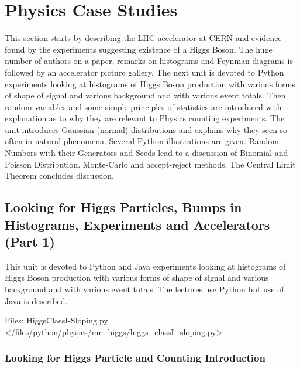 

\section{Physics Case Studies}\label{physics-case-study}

\FILENAME

This section starts by describing the LHC accelerator at CERN and
evidence found by the experiments suggesting existence of a Higgs Boson.
The huge number of authors on a paper, remarks on histograms and Feynman
diagrams is followed by an accelerator picture gallery. The next unit is
devoted to Python experiments looking at histograms of Higgs Boson
production with various forms of shape of signal and various background
and with various event totals. Then random variables and some simple
principles of statistics are introduced with explanation as to why they
are relevant to Physics counting experiments. The unit introduces
Gaussian (normal) distributions and explains why they seen so often in
natural phenomena. Several Python illustrations are given. Random
Numbers with their Generators and Seeds lead to a discussion of Binomial
and Poisson Distribution. Monte-Carlo and accept-reject methods. The
Central Limit Theorem concludes discussion.

\subsection{Looking for Higgs Particles, Bumps in Histograms,
Experiments and Accelerators (Part
1)}\label{looking-for-higgs-particles-bumps-in-histograms-experiments-and-accelerators-part-1}

This unit is devoted to Python and Java experiments looking at
histograms of Higgs Boson production with various forms of shape of
signal and various background and with various event totals. The
lectures use Python but use of Java is described.


Files:
HiggsClassI-Sloping.py \textless{}/files/python/physics/mr\_higgs/higgs\_classI\_sloping.py\textgreater{}\_

\subsubsection{Looking for Higgs Particle and Counting
Introduction}\label{looking-for-higgs-particle-and-counting-introduction}


